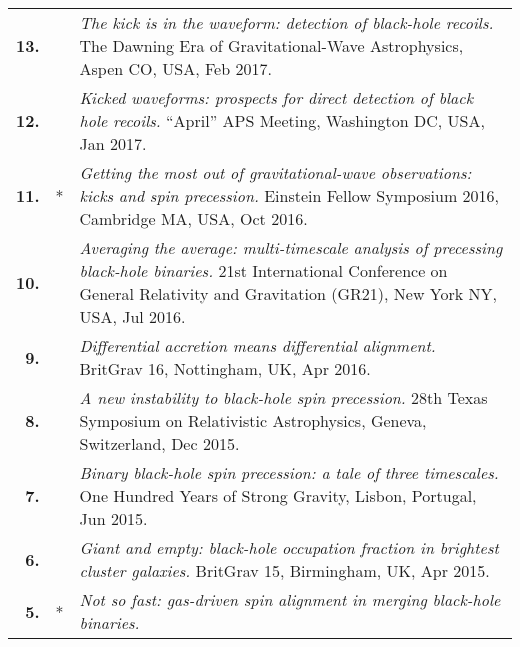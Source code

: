 \documentclass[11pt,letterpaper,sans]{moderncv}   %
\begin{document}
{\begin{longtable}{rp{0.4cm}p{15.8cm}}
\textbf{13.} & & \textit{The kick is in the waveform: detection of black-hole recoils.}
\newline{}The Dawning Era of Gravitational-Wave Astrophysics, Aspen CO, USA, Feb 2017.
\vspace{0.05cm}\\
\textbf{12.} & & \textit{Kicked waveforms: prospects for direct detection of black hole recoils.}
\newline{}``April'' APS Meeting, Washington DC, USA, Jan 2017.
\vspace{0.05cm}\\
\textbf{11.} & * & \textit{Getting the most out of gravitational-wave observations: kicks and spin precession.}
\newline{}Einstein Fellow Symposium 2016, Cambridge MA, USA, Oct 2016.
\vspace{0.05cm}\\
\textbf{10.} & & \textit{Averaging the average: multi-timescale analysis of precessing black-hole binaries.}
\newline{}21st International Conference on General Relativity and Gravitation (GR21), New York NY, USA, Jul 2016.
\vspace{0.05cm}\\
\textbf{9.} & & \textit{Differential accretion means differential alignment.}
\newline{}BritGrav 16, Nottingham, UK, Apr 2016.
\vspace{0.05cm}\\
\textbf{8.} & & \textit{A new instability to black-hole spin precession.}
\newline{}28th Texas Symposium on Relativistic Astrophysics, Geneva, Switzerland, Dec 2015.
\vspace{0.05cm}\\
\textbf{7.} & & \textit{Binary black-hole spin precession: a tale of three timescales.}
\newline{} 
One Hundred Years of Strong Gravity, Lisbon, Portugal, Jun 2015.
\vspace{0.05cm}\\
\textbf{6.} & & \textit{Giant and empty: black-hole occupation fraction in brightest cluster galaxies.}
\newline{} 
BritGrav 15, Birmingham, UK, Apr 2015.
\vspace{0.05cm}\\
\textbf{5.} & * & \textit{Not so fast: gas-driven spin alignment in merging black-hole binaries.}
\newline{} 

\end{longtable}}
\end{document}
